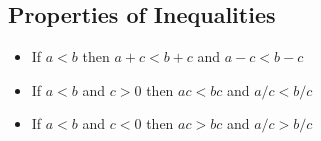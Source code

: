 \documentclass[12pt, a5paper]{article}
\begin{document}
\subsection*{Properties of Inequalities}
\begin{itemize}
\item{If $a < b$ then $a + c < b + c$ and $a - c < b - c$}
\item{If $a < b$ and $c > 0$ then $ac < bc$ and $a/c < b/c$}
\item{If $a < b$ and $c < 0$ then $ac > bc$ and $a/c > b/c$}
\end{itemize}
\end{document}
